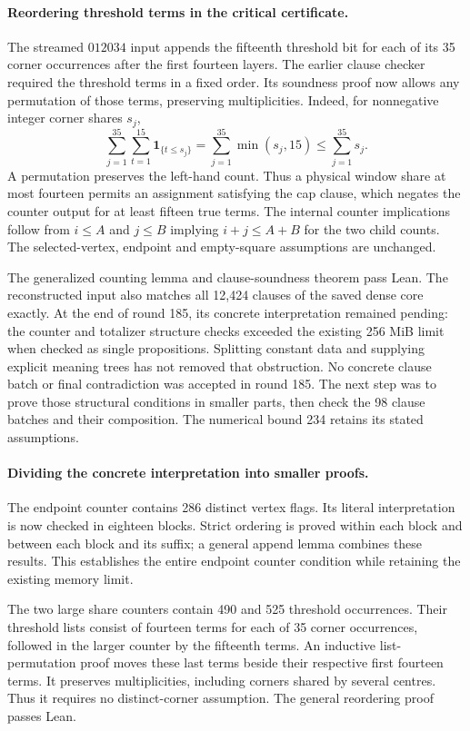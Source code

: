 \documentclass[11pt,a4paper]{article}
\theoremstyle{definition}
\theoremstyle{remark}
\begin{document}
\paragraph{Reordering threshold terms in the critical certificate.}
The streamed $012034$ input appends the fifteenth threshold bit for each
of its 35 corner occurrences after the first fourteen layers. The earlier
clause checker required the threshold terms in a fixed order. Its
soundness proof now allows any permutation of those terms, preserving
multiplicities. Indeed, for nonnegative integer corner shares $s_j$,
\[
\sum_{j=1}^{35}\sum_{t=1}^{15}\mathbf{1}_{\{t\le s_j\}}
 =\sum_{j=1}^{35}\min(s_j,15)\le\sum_{j=1}^{35}s_j.
\]
A permutation preserves the left-hand count. Thus a physical window
share at most fourteen permits an assignment satisfying the cap clause,
which negates the counter output for at least fifteen true terms.
The internal counter implications follow from
$i\le A$ and $j\le B$ implying $i+j\le A+B$ for the two child counts.
The selected-vertex, endpoint and empty-square assumptions are unchanged.

The generalized counting lemma and clause-soundness theorem pass Lean.
The reconstructed input also matches all 12,424 clauses of the saved
dense core exactly. At the end of round 185, its concrete interpretation remained
pending: the counter and totalizer structure checks exceeded the existing
256 MiB limit when checked as single propositions. Splitting constant
data and supplying explicit meaning trees has not removed that
obstruction. No concrete clause batch or final contradiction was
accepted in round 185. The next step was to prove those structural
conditions in smaller parts, then check the 98 clause batches and their
composition. The numerical bound 234 retains its stated assumptions.

\paragraph{Dividing the concrete interpretation into smaller proofs.}
The endpoint counter contains 286 distinct vertex flags. Its literal
interpretation is now checked in eighteen blocks. Strict ordering is
proved within each block and between each block and its suffix; a general
append lemma combines these results. This establishes the entire endpoint
counter condition while retaining the existing memory limit.

The two large share counters contain 490 and 525 threshold occurrences.
Their threshold lists consist of fourteen terms for each of 35 corner
occurrences, followed in the larger counter by the fifteenth terms.
An inductive list-permutation proof moves these last terms beside their
respective first fourteen terms. It preserves multiplicities, including
corners shared by several centres. Thus it requires no distinct-corner
assumption. The general reordering proof passes Lean.
\end{document}
